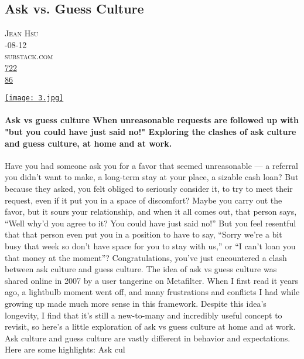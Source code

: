 \documentclass[10pt,a4paper]{article}
\begin{document}
\subsection{Ask vs. Guess Culture}
\noindent\begin{minipage}[t]{0.20\linewidth}
\vspace{0pt}
\noindent\textsc{\footnotesize
{\scriptsize\faUser}\space 
Jean Hsu \\
{\scriptsize\faCalendar}-08-12 \\
{\scriptsize\faGlobe}\space 
substack.com \\
{\scriptsize\faThumbsOUp}\space 
\href{http://news.ycombinator.com/item?id=37176703\&utm\_term=comment}{722} \\
{\scriptsize\faComments}\space 
\href{http://news.ycombinator.com/item?id=37176703\&utm\_term=comment}{86} \\
}
\end{minipage} %
\begin{minipage}[t]{0.80\linewidth}
\vspace{0pt}
\begin{multicols}{2}

    \href{https://jeanhsu.substack.com/p/ask-vs-guess-culture?utm\_source=hackernewsletter\&utm\_medium=email\&utm\_term=fav}{
        \texttt{[image: 3.jpg]}
    }
  
\paragraph{Ask vs guess culture
When unreasonable requests are followed up with "but you could have just said no!" Exploring the clashes of ask culture and guess culture, at home and at work.}

Have you had someone ask you for a favor that seemed unreasonable — a referral you didn’t want to make, a long-term stay at your place, a sizable cash loan? But because they asked, you felt obliged to seriously consider it, to try to meet their request, even if it put you in a space of discomfort? Maybe you carry out the favor, but it sours your relationship, and when it all comes out, that person says, “Well why’d you agree to it? You could have just said no!”
But you feel resentful that that person even put you in a position to have to say, “Sorry we’re a bit busy that week so don’t have space for you to stay with us,” or “I can’t loan you that money at the moment”?
Congratulations, you’ve just encountered a clash between ask culture and guess culture.
The idea of ask vs guess culture was shared online in 2007 by a user tangerine on Metafilter. When I first read it years ago, a lightbulb moment went off, and many frustrations and conflicts I had while growing up made much more sense in this framework.
Despite this idea’s longevity, I find that it’s still a new-to-many and incredibly useful concept to revisit, so here’s a little exploration of ask vs guess culture at home and at work.
Ask culture and guess culture are vastly different in behavior and expectations. Here are some highlights:
Ask cul

\end{multicols}
\end{minipage}
\end{document}
